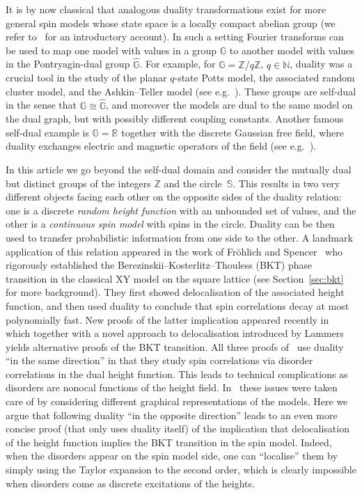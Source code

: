 \documentclass[11pt, reqno]{amsart}
\numberwithin{equation}{section}
\theoremstyle{definition}
\theoremstyle{remark}
\begin{document}
It is by now classical that analogous duality transformations exist for more general spin models 
whose state space is a locally compact abelian group \cite{WuWa, FroSpe, Savit} (we refer to~\cite{dubedat2011topics} for an introductory account). 
In such a setting Fourier transforms can be used to map one model with values in a group $\mathbb G$ to another model with values in the Pontryagin-dual group $\widehat {\mathbb G}$. For example, for $\mathbb G= {\mathbb Z/q \mathbb Z}$, $ q\in \mathbb N$,
duality was a crucial tool in the study of the planar $q$-state Potts model, the associated random cluster model, and the Ashkin--Teller model (see e.g.~\cite{BefDum,PfiVel,GlaPel,Lis19,Lis21,ADG}). These groups are self-dual in the sense that $\mathbb G\cong \widehat{\mathbb G}$, 
and moreover the models are dual to the same model on the dual graph, but with possibly different coupling constants. Another famous self-dual example is $\mathbb G=\mathbb R$ together with the discrete Gaussian free field, where duality exchanges electric and magnetic operators of the field (see e.g.~\cite{dubedat2011topics}).

In this article we go beyond the self-dual domain and consider the mutually dual but distinct groups of the integers ${\mathbb Z}$ and the circle~$\mathbb S$. 
This results in two very different objects facing each other on the opposite sides of the duality relation: one is a discrete \emph{random height function} with an unbounded set of values, and the other is a \emph{continuous spin model} with spins in the circle.
Duality can be then used to transfer probabilistic information from one side to the other.
 A landmark application of this relation appeared in the work of Fr\"ohlich and Spencer~\cite{FroSpe} who rigorously established the Berezinskii--Kosterlitz--Thouless (BKT) phase transition in the classical XY model on the square lattice (see Section~\ref{sec:bkt} for more background). They first showed delocalisation of the associated height function, and then used duality to conclude that spin correlations decay at most polynomially fast. New proofs of the latter implication appeared recently in~\cite{vEnLis,AHPS} which together with a novel approach to delocalisation introduced by Lammers~\cite{Lammers} yields alternative proofs of the BKT transition. All three proofs of~\cite{FroSpe,vEnLis,AHPS} use duality ``in the same direction'' in that they study spin correlations via disorder correlations in the dual height function. This leads to technical complications as disorders are nonocal functions of the height field.
 In~\cite{vEnLis,AHPS} these issues were taken care of by considering different graphical representations of the models. Here we argue that following duality ``in the opposite direction''
 leads to an even more concise proof (that only uses duality itself) of the implication that delocalisation of the height function implies the BKT transition in the spin model.  
Indeed, when the disorders appear on the spin model side, one can ``localise'' them by simply using the Taylor expansion to the second order, which is clearly impossible when disorders 
come as discrete excitations of the heights. 
\end{document}
